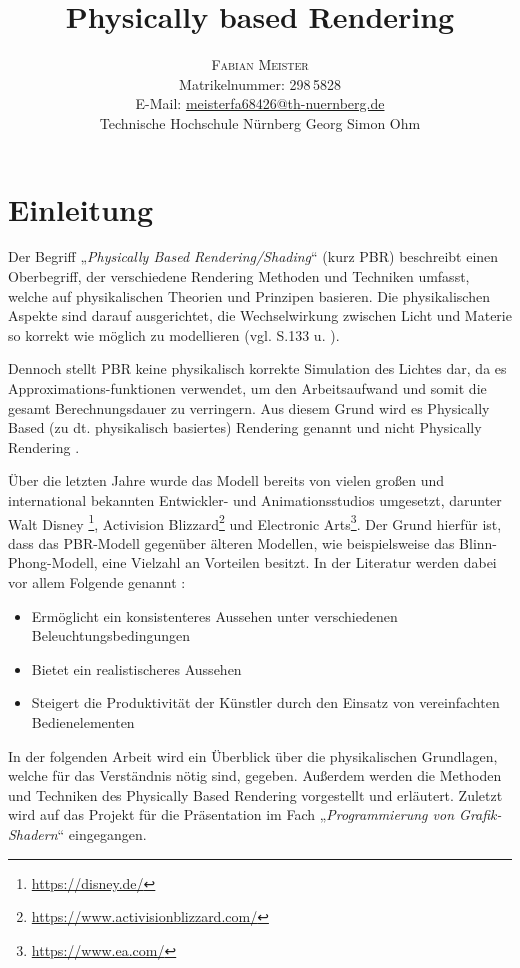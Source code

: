 \documentclass[
  11pt,
  a4paper,
  oneside
  ]{article}
\title{Physically based Rendering} %
\author{%
\textsc{Fabian Meister} \\[1ex] %
\normalsize Matrikelnummer: 298\,5828 \\ %
\normalsize E-Mail: \href{mailto:meisterfa68426@th-nuernberg.de}{meisterfa68426@th-nuernberg.de} \\%
\normalsize Technische Hochschule Nürnberg Georg Simon Ohm \\ %
}
\date{} %
\begin{document}
\maketitle


\section{Einleitung}
Der Begriff „\textit{Physically Based Rendering/Shading}“ (kurz PBR) beschreibt einen Oberbegriff, der verschiedene Rendering Methoden und Techniken umfasst, welche auf physikalischen Theorien und Prinzipen basieren. Die physikalischen Aspekte sind darauf ausgerichtet, die Wechselwirkung zwischen Licht und Materie so korrekt wie möglich zu modellieren
(vgl. S.133 \cite{openGlWolf} u. \cite{learnOpenGL}).

Dennoch stellt PBR keine physikalisch korrekte Simulation des Lichtes dar, da es Approximations-funktionen verwendet, um den Arbeitsaufwand und somit die gesamt Berechnungsdauer zu verringern. Aus diesem Grund wird es Physically Based (zu dt. physikalisch basiertes) Rendering genannt und nicht Physically Rendering
\cite{learnOpenGL}.

Über die letzten Jahre wurde das Modell bereits von vielen großen und international bekannten Entwickler- und Animationsstudios umgesetzt, darunter Walt Disney
\footnote{\url{https://disney.de/}}, Activision Blizzard\footnote{\url{https://www.activisionblizzard.com/}} und Electronic Arts\footnote{\url{https://www.ea.com/}}. 
Der Grund hier\-für ist, dass das PBR-Modell gegenüber älteren Modellen, wie beispielsweise das Blinn-Phong-Modell, eine Vielzahl an Vorteilen besitzt. In der Literatur werden dabei vor allem Folgende genannt 
\cite{reasonsForPbr1,reasonsForPbr2,pbrGuide,learnOpenGL}:
\begin{itemize}
  \item Ermöglicht ein konsistenteres Aussehen unter verschiedenen Beleuchtungsbedingungen 
  \item Bietet ein realistischeres Aussehen
  \item Steigert die Produktivität der Künstler durch den Einsatz von vereinfachten Bedienelementen
\end{itemize}

In der folgenden Arbeit wird ein Überblick über die physikalischen Grundlagen, welche für das Verständnis nötig sind, gegeben. Außerdem werden die Methoden und Techniken des Physically Based Rendering vorgestellt und erläutert. Zuletzt wird auf das Projekt für die Präsentation im Fach „\textit{Programmierung von Grafik-Shadern}“ eingegangen. 
\end{document}
